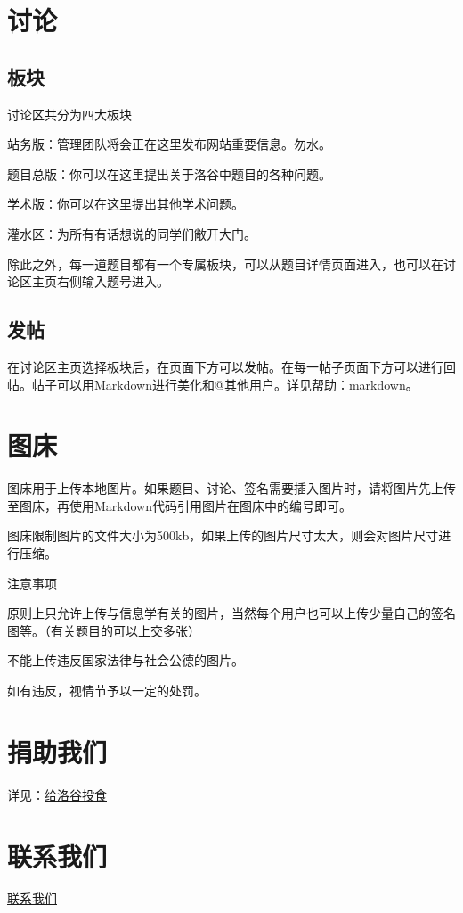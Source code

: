\documentclass[10pt,a4paper]{article}
\begin{document}
		\section{
			讨论}
		
		\subsection{
			板块}
		
		
		讨论区共分为四大板块
		\begin{itemize}{
				\item 
				
				
				站务版：管理团队将会正在这里发布网站重要信息。勿水。
				\item 
				
				
				题目总版：你可以在这里提出关于洛谷中题目的各种问题。
				\item 
				
				
				学术版：你可以在这里提出其他学术问题。
				\item 灌水区：为所有有话想说的同学们敞开大门。}
		\end{itemize}
		
		
		除此之外，每一道题目都有一个专属板块，可以从题目详情页面进入，也可以在讨论区主页右侧输入题号进入。
		
		\subsection{
			发帖}
		
		
		在讨论区主页选择板块后，在页面下方可以发帖。在每一帖子页面下方可以进行回帖。帖子可以用Markdown进行美化和@其他用户。详见\href{https://www.luogu.org/wiki/show?name=%E5%B8%AE%E5%8A%A9%EF%BC%9Amarkdown}{帮助：markdown}。
			
			\section{
				图床}
			
			
			图床用于上传本地图片。如果题目、讨论、签名需要插入图片时，请将图片先上传至图床，再使用Markdown代码引用图片在图床中的编号即可。
			
			
			图床限制图片的文件大小为500kb，如果上传的图片尺寸太大，则会对图片尺寸进行压缩。
			
			
			注意事项
			\begin{itemize}{
					\item 
					
					
					原则上只允许上传与信息学有关的图片，当然每个用户也可以上传少量自己的签名图等。（有关题目的可以上交多张）
					\item 不能上传违反国家法律与社会公德的图片。}
			\end{itemize}
			
			
			如有违反，视情节予以一定的处罚。
			
			\section{
				捐助我们}
			
			
			详见：\href{https://www.luogu.org/discuss/show?postid=17348}{给洛谷投食}
			
			\section{
				联系我们}
			
			\href{https://www.luogu.org/wiki/show?name=%E8%81%94%E7%B3%BB%E6%88%91%E4%BB%AC}{
				联系我们}
\end{document}
